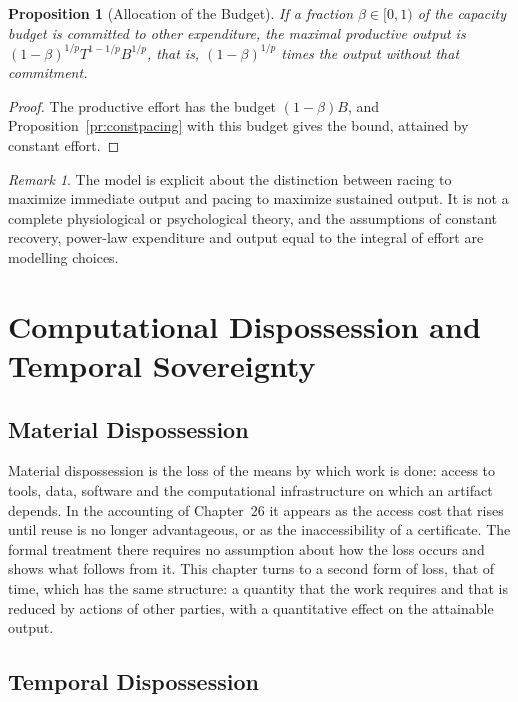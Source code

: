 \documentclass[11pt,letterpaper]{report}
\theoremstyle{plain}
\newtheorem{proposition}[theorem]{Proposition}
\theoremstyle{definition}
\theoremstyle{remark}
\newtheorem{remark}[theorem]{Remark}
\begin{document}
\begin{proposition}[Allocation of the Budget]\label{pr:allocation}
If a fraction $\beta\in[0,1)$ of the capacity budget is committed to other expenditure, the maximal productive output is $(1-\beta)^{1/p}T^{1-1/p}B^{1/p}$, that is, $(1-\beta)^{1/p}$ times the output without that commitment.
\end{proposition}
\begin{proof}
The productive effort has the budget $(1-\beta)B$, and Proposition~\ref{pr:constpacing} with this budget gives the bound, attained by constant effort.
\end{proof}

\begin{remark}
The model is explicit about the distinction between racing to maximize immediate output and pacing to maximize sustained output. It is not a complete physiological or psychological theory, and the assumptions of constant recovery, power-law expenditure and output equal to the integral of effort are modelling choices.
\end{remark}

\chapter{Computational Dispossession and Temporal Sovereignty}

\section{Material Dispossession}

Material dispossession is the loss of the means by which work is done: access to tools, data, software and the computational infrastructure on which an artifact depends. In the accounting of Chapter~26 it appears as the access cost that rises until reuse is no longer advantageous, or as the inaccessibility of a certificate. The formal treatment there requires no assumption about how the loss occurs and shows what follows from it. This chapter turns to a second form of loss, that of time, which has the same structure: a quantity that the work requires and that is reduced by actions of other parties, with a quantitative effect on the attainable output.

\section{Temporal Dispossession}
\end{document}
